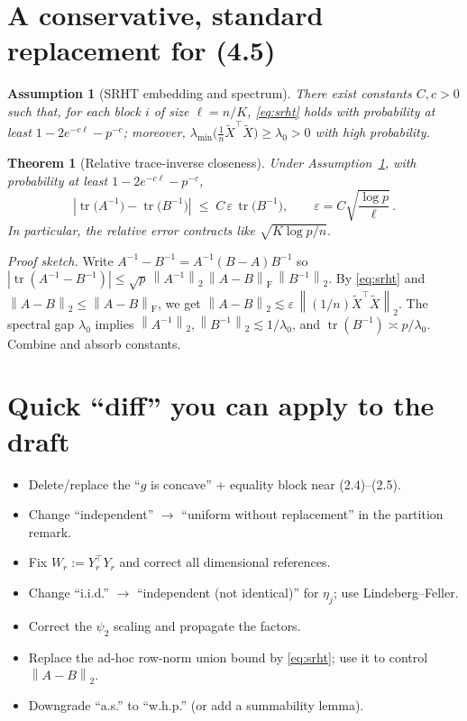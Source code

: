 \documentclass[11pt]{article}
\newcommand{\tr}{\operatorname{tr}}
\newcommand{\opnorm}[1]{\left\lVert #1 \right\rVert_{2}}
\newcommand{\frnorm}[1]{\left\lVert #1 \right\rVert_{\mathrm{F}}}
\newcommand{\eps}{\varepsilon}
\theoremstyle{plain}
\newtheorem{theorem}{Theorem}
\newtheorem{assumption}{Assumption}
\begin{document}
\section{A conservative, standard replacement for (4.5)}
\begin{assumption}[SRHT embedding and spectrum]\label{ass:srht}
There exist constants \(C,c>0\) such that, for each block \(i\) of size \(\ell=n/K\),
\eqref{eq:srht} holds with probability at least \(1-2e^{-c\ell}-p^{-c}\);
moreover, \(\lambda_{\min}\!\big(\frac{1}{n}\tilde X^\top \tilde X\big)\ge \lambda_0>0\) with high probability.
\end{assumption}

\begin{theorem}[Relative trace-inverse closeness]\label{thm:main}
Under Assumption~\ref{ass:srht}, with probability at least \(1-2e^{-c\ell}-p^{-c}\),
\begin{equation}
\label{eq:main-trace}
\left|\tr\big(A^{-1}\big)-\tr\big(B^{-1}\big)\right|
\;\le\;
C\,\eps\,\tr\big(B^{-1}\big),\qquad
\eps = C\sqrt{\frac{\log p}{\ell}}\,.
\end{equation}
In particular, the relative error contracts like \(\sqrt{K\log p/n}\).
\end{theorem}

\noindent\textit{Proof sketch.}
Write \(A^{-1}-B^{-1}=A^{-1}(B-A)B^{-1}\) so
\(|\tr(A^{-1}-B^{-1})| \le \sqrt{p}\,\opnorm{A^{-1}}\,\frnorm{A-B}\,\opnorm{B^{-1}}\).
By \eqref{eq:srht} and \(\opnorm{A-B}\le \frnorm{A-B}\), we get
\(\opnorm{A-B}\lesssim \eps\,\opnorm{(1/n)\tilde X^\top \tilde X}\).
The spectral gap \(\lambda_0\) implies \(\opnorm{A^{-1}},\opnorm{B^{-1}}\lesssim 1/\lambda_0\), and \(\tr(B^{-1})\asymp p/\lambda_0\). Combine and absorb constants.

\section{Quick ``diff'' you can apply to the draft}
\begin{itemize}[leftmargin=*]
\item Delete/replace the ``\(g\) is concave'' + equality block near (2.4)--(2.5).
\item Change ``independent'' \(\to\) ``uniform without replacement'' in the partition remark.
\item Fix \(W_r:=Y_r^\top Y_r\) and correct all dimensional references.
\item Change ``i.i.d.'' \(\to\) ``independent (not identical)'' for \(\eta_j\); use Lindeberg--Feller.
\item Correct the \(\psi_2\) scaling and propagate the factors.
\item Replace the ad-hoc row-norm union bound by \eqref{eq:srht}; use it to control \(\opnorm{A-B}\).
\item Downgrade ``a.s.'' to ``w.h.p.'' (or add a summability lemma).
\end{itemize}
\end{document}
